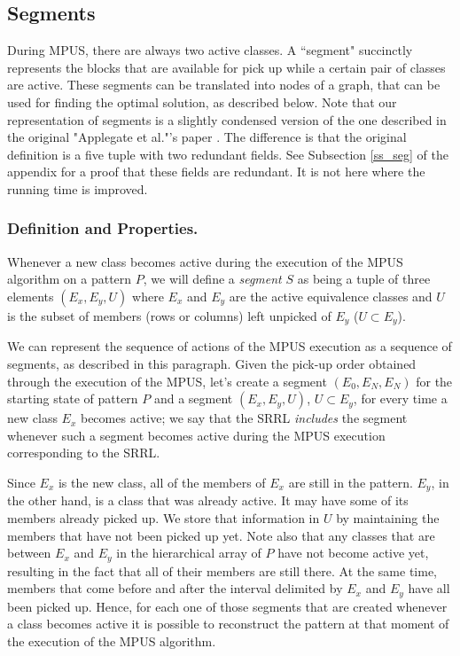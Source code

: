 \subsection{Segments}

During MPUS, there are always two active classes. A ``segment"
succinctly represents the blocks that are available for pick up
while a certain pair of classes are active.
These segments can be translated into nodes of a graph, that can be used for finding the optimal solution, as described below. Note that our representation of segments is a slightly condensed version of the one described in the original
"Applegate et al."'s paper \cite{ACJKLW07}. The difference is that
the original definition is a five tuple with two redundant fields.
See Subsection \ref{ss_seg} of the appendix for a proof that these fields are
redundant. It is not here where the running time is improved.

\subsubsection{Definition and Properties.}

Whenever a new class becomes active during the execution of the MPUS algorithm
 on a pattern $P$, we will define a {\em segment} $S$ as being a tuple of
three elements $(E_{x},E_{y},U)$ where $E_{x}$ and $E_{y}$ are the active
equivalence classes and $U$ is the subset of members (rows or columns)
 left unpicked of $E_{y}$ ($U \subset E_{y}$).

We can represent the sequence of actions of the MPUS execution as
a sequence of segments, as described in this paragraph.
 Given the pick-up order obtained through the execution of the MPUS,
let's create a segment $(E_{0}, E_{N}, E_{N})$ for the starting state of pattern $P$ and a segment $(E_{x}, E_{y}, U)$, $U \subset E_{y}$, for every time a new class $E_{x}$ becomes active; we say that the SRRL {\em includes} the
segment whenever such a segment becomes active during the MPUS execution
corresponding to the SRRL.

Since $E_{x}$ is the new class, all of the members of $E_{x}$ are still in the pattern. $E_{y}$, in the other hand, is a class that was already active. It may have some of its members already picked up. We store that information in $U$ by maintaining the members that have not been picked up yet. Note also that any classes that are between $E_{x}$ and $E_{y}$ in the hierarchical array of $P$ have not become active yet, resulting in the fact that all of
their members are still there. At the same time, members that come before and after the interval delimited by $E_{x}$ and $E_{y}$ have all been picked up. Hence, for each one of those segments that are created whenever a class becomes active it is possible to reconstruct the pattern at that moment of the execution of the MPUS algorithm.

